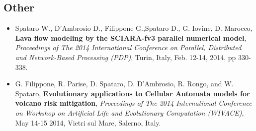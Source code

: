 \documentclass[a4paper,10pt]{article}
\begin{document}
\subsection{Other}	
\begin{itemize}
	\item Spataro W., D'Ambrosio D., Filippone G.,Spataro D., G.
    Iovine, D. Marocco, \textbf{Lava flow modeling by the SCIARA-fv3
    parallel numerical model}, \emph{Proceedings of The 2014 International
    Conference on Parallel, Distributed and Network-Based Processing (PDP)}, Turin, Italy, Feb. 12-14,
    2014, pp 330-338.
    
    \item G. Filippone, R. Parise, D. Spataro,
	D. D'Ambrosio, R. Rongo, and W. Spataro, \textbf{Evolutionary
	applications to Cellular Automata models for volcano risk mitigation},
	\emph{Proceedings of The 2014 International Conference on Workshop on Artificial Life and
	Evolutionary Computation (WIVACE)}, May 14-15 2014, Vietri sul Mare, Salerno,
	Italy.
		


\end{itemize}
\end{document}
